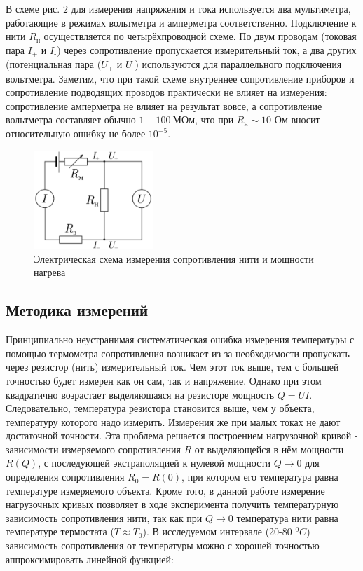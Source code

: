 \documentclass[a4paper,12pt]{article}
\begin{document}
        В схеме рис. 2 для измерения напряжения и тока используется два мультиметра, работающие в режимах вольтметра и амперметра соответственно.
        Подключение к нити $R_{\text{н}}$ осуществляется по четырёхпроводной схеме. По двум
        проводам (токовая пара $I_{\text{+}}$ и $I_{\text{-}}$) через сопротивление пропускается измерительный ток, а два других (потенциальная пара ($U_{\text{+}}$ и $U_{\text{-}}$) используются для
        параллельного подключения вольтметра. Заметим, что
        при такой схеме внутреннее сопротивление приборов и сопротивление подводящих проводов практически не влияет на измерения: сопротивление амперметра не влияет на результат вовсе, а сопротивление вольтметра составляет
        обычно $1-100 \ \text{МОм}$, что при $R_{\text{н}} \sim 10$ Ом вносит относительную ошибку не более $10^{-5}$.

        \begin{figure}
        \begin{center}
            \includegraphics[width = 0.4\textwidth]{chain.png}
        \end{center}
        \caption{Электрическая схема измерения сопротивления нити и мощности нагрева}
        \end{figure}
        \newpage
        \subsection{Методика измерений}
        Принципиально неустранимая систематическая ошибка измерения температуры с помощью термометра сопротивления возникает из-за необходимости пропускать через резистор (нить) измерительный ток. Чем этот ток выше, тем с большей точностью будет измерен как он сам, так и напряжение. Однако при этом квадратично возрастает выделяющаяся на  резисторе мощность $Q = UI$. Следовательно, температура резистора становится выше, чем у объекта, температуру которого надо измерить. Измерения же при малых токах не дают достаточной точности. Эта проблема решается построением нагрузочной кривой - зависимости измеряемого сопротивления $R$ от выделяющейся в нём мощности $R(Q)$, с последующей экстраполяцией к нулевой мощности $Q \to 0$ для определения сопротивления $R_0 = R(0)$, при котором его температура равна температуре измеряемого объекта. Кроме того, в данной работе измерение нагрузочных кривых позволяет в ходе эксперимента получить температурную зависимость сопротивления нити, так как при $Q \to 0$ температура нити равна температуре термостата ($T \approx T_0$). В исследуемом интервале  (20-80 $^0C$) зависимость сопротивления от температуры можно с хорошей точностью аппроксимировать линейной функцией:
\end{document}
